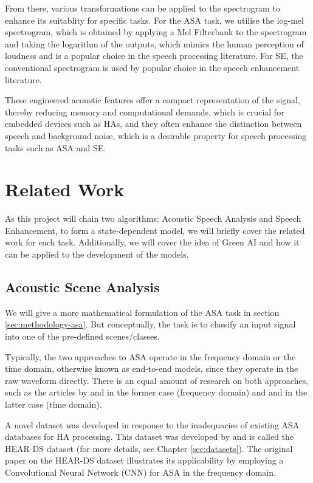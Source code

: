 \documentclass[logo,bsc,singlespacing,parskip,online]{infthesis}
\begin{document}
From there, various transformations can be applied to the spectrogram 
to enhance its suitablity for specific tasks. For the ASA task, we utilise the 
log-mel spectrogram, which is obtained by applying a Mel Filterbank to the spectrogram 
and taking the logarithm of the outputs, which mimics the human perception 
of loudness and is a popular choice in the speech processing literature. 
For SE, the conventional spectrogram is used by popular choice in the speech enhancement literature.

These engineered acoustic features offer a compact representation of the signal, thereby 
reducing memory and computational demands, which is crucial for embedded devices such as 
HAs, and they often enhance the distinction between speech and background noise, 
which is a desirable property for speech processing tasks such as ASA and SE.
\section{Related Work}
As this project will chain two algorithms: Acoustic Speech Analysis and Speech Enhancement, 
to form a state-dependent model, we will briefly cover the related work for each task.
Additionally, we will cover the idea of Green AI and how it can be applied to the development of the models.

\subsection{Acoustic Scene Analysis}
We will give a more mathematical formulation of the ASA task in section \ref{sec:methodology-asa}. 
But conceptually, the task is to classify an input signal into one of the pre-defined scenes/classes.

Typically, the two approaches to ASA operate 
in the frequency domain or the time domain, otherwise known as end-to-end models, 
since they operate in the raw waveform directly. 
There is an equal amount of research on both approaches, 
such as the articles by \citet{schindler_multi-temporal_2018} and \citet{kim_specmix_2021} 
in the former case (frequency domain) and \citet{dai_very_2016} 
and \citet{kumar_end_2020} in the latter case (time domain).

A novel dataset was developed in response to the inadequacies of existing ASA databases for HA processing. 
This dataset was developed by \citet{Huwel2020HearDS} and is called the HEAR-DS dataset (for more details, see Chapter \ref{sec:datasets}).
The original paper on the HEAR-DS dataset illustrates its applicability by employing a Convolutional Neural Network (CNN) for ASA in the frequency domain. 
\end{document}
